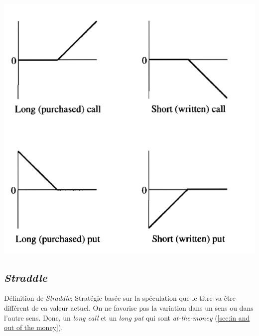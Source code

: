\documentclass[11pt,french]{report}
\begin{document}
\includegraphics[scale=0.43]{picture25.PNG}

\subsection{\emph{Straddle}}
\label{sec:sec:straddle}

Définition de \emph{Straddle}: Stratégie basée sur la spéculation que le titre va être différent de ca valeur actuel. On ne favorise pas la variation dans un sens ou dans l'autre sens. Donc, un \emph{long call} et un \emph{long put} qui sont \emph{at-the-money} (\ref{sec:in and out of the money}).
\end{document}
